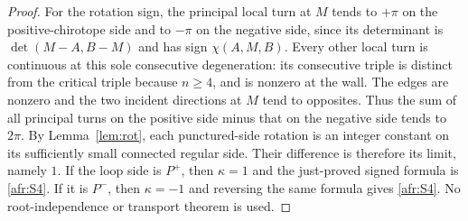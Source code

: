 \begin{proof}
For the rotation sign, the principal local turn at $M$ tends to
$+\pi$ on the positive-chirotope side and to $-\pi$ on the
negative side, since its determinant is $\det(M-A,B-M)$ and
has sign $\chi(A,M,B)$.  Every other local turn is continuous at
this sole consecutive degeneration: its consecutive triple is distinct
from the critical triple because $n\geq4$, and is nonzero at the wall.
The edges are nonzero and the two incident directions at $M$ tend to
opposites. Thus the sum of all principal turns on the positive side
minus that on the negative side tends to $2\pi$. By
Lemma~\ref{lem:rot}, each punctured-side rotation is an integer constant
on its sufficiently small connected regular side. Their difference is
therefore its limit, namely $1$.  If the loop side is $P^+$, then
$\kappa=1$ and the just-proved signed formula is
\eqref{afr:S4}.  If it is $P^-$, then $\kappa=-1$ and
reversing the same formula gives \eqref{afr:S4}.
No root-independence or transport theorem is used.
\end{proof}

